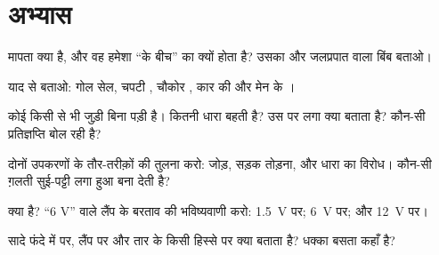 \section{अभ्यास}

\begin{exercise}[$\star$]\label{exo:g8:voltage-voltmeter:1}
 मापता क्या है, और वह हमेशा ``के बीच'' का क्यों होता है?
उसका  और जलप्रपात वाला बिंब बताओ।
\end{exercise}

\begin{exercise}[$\star$]\label{exo:g8:voltage-voltmeter:2}
याद से बताओ: गोल सेल, चपटी , चौकोर , कार की  और मेन के
।
\end{exercise}

\begin{exercise}[$\star$]\label{exo:g8:voltage-voltmeter:3}
कोई  किसी से भी जुड़ी बिना पड़ी है। कितनी धारा बहती है? उस पर
लगा  क्या बताता है? कौन-सी प्रतिज्ञप्ति बोल रही है?
\end{exercise}

\begin{exercise}[$\star$]\label{exo:g8:voltage-voltmeter:4}
दोनों उपकरणों के तौर-तरीक़ों की तुलना करो: जोड़, सड़क तोड़ना, और धारा
का विरोध। कौन-सी ग़लती सुई-पट्टी लगा हुआ  बना देती है?
\end{exercise}

\begin{exercise}[$\star$]\label{exo:g8:voltage-voltmeter:5}
 क्या है? ``6 V'' वाले लैंप के बरताव की भविष्यवाणी करो:
\qty{1.5}{V} पर; \qty{6}{V} पर; और \qty{12}{V} पर।
\end{exercise}

\begin{exercise}[$\star$]\label{exo:g8:voltage-voltmeter:6}
सादे फंदे में   पर, लैंप पर और तार के किसी हिस्से पर
क्या बताता है? धक्का बसता कहाँ है?
\end{exercise}

